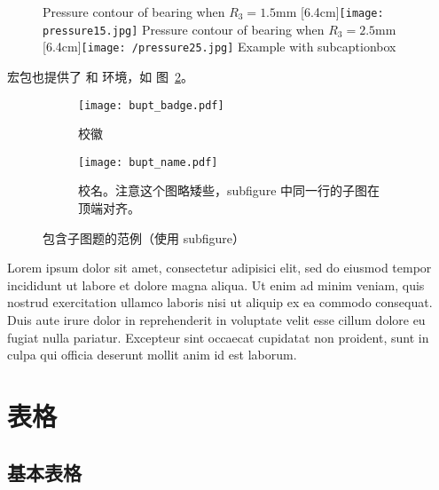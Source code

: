 \begin{figure}[!hbtp]
  \centering
                  {Pressure contour of bearing when $R_3 = 1.5\text{mm}$}%
                  [6.4cm]{\texttt{[image: pressure15.jpg]}}
  \hspace{1cm}
                  {Pressure contour of bearing when $R_3 = 2.5\text{mm}$}%
                  [6.4cm]{\texttt{[image: /pressure25.jpg]}}
            {Example with subcaptionbox}
  \label{fig:bisubcaptionbox}
\end{figure}

 宏包也提供了  和  环境，如
图~\ref{fig:subfigure}。

\begin{figure}[!htp]
  \centering
  \begin{subfigure}{0.3\textwidth}
    \centering
    \texttt{[image: bupt\_badge.pdf]}
    \caption{校徽}
  \end{subfigure}
  \hspace{1cm}
  \begin{subfigure}{0.4\textwidth}
    \centering
    \texttt{[image: bupt\_name.pdf]}
    \caption{校名。注意这个图略矮些，subfigure 中同一行的子图在顶端对齐。}
  \end{subfigure}
  \caption{包含子图题的范例（使用 subfigure）}
  \label{fig:subfigure}
\end{figure}

Lorem ipsum dolor sit amet, consectetur adipisici elit, sed do eiusmod tempor
incididunt ut labore et dolore magna aliqua. Ut enim ad minim veniam, quis
nostrud exercitation ullamco laboris nisi ut aliquip ex ea commodo consequat.
Duis aute irure dolor in reprehenderit in voluptate velit esse cillum dolore eu
fugiat nulla pariatur. Excepteur sint occaecat cupidatat non proident, sunt in
culpa qui officia deserunt mollit anim id est laborum.

\section{表格}

\subsection{基本表格}


